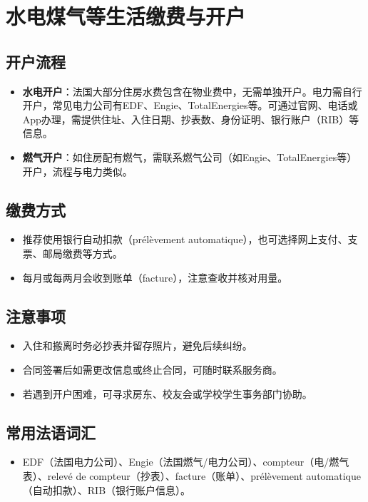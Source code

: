 \section{水电煤气等生活缴费与开户}

\subsection{开户流程}
\begin{itemize}
    \item \textbf{水电开户}：法国大部分住房水费包含在物业费中，无需单独开户。电力需自行开户，常见电力公司有EDF、Engie、TotalEnergies等。可通过官网、电话或App办理，需提供住址、入住日期、抄表数、身份证明、银行账户（RIB）等信息。
    \item \textbf{燃气开户}：如住房配有燃气，需联系燃气公司（如Engie、TotalEnergies等）开户，流程与电力类似。
\end{itemize}

\subsection{缴费方式}
\begin{itemize}
    \item 推荐使用银行自动扣款（prélèvement automatique），也可选择网上支付、支票、邮局缴费等方式。
    \item 每月或每两月会收到账单（facture），注意查收并核对用量。
\end{itemize}

\subsection{注意事项}
\begin{itemize}
    \item 入住和搬离时务必抄表并留存照片，避免后续纠纷。
    \item 合同签署后如需更改信息或终止合同，可随时联系服务商。
    \item 若遇到开户困难，可寻求房东、校友会或学校学生事务部门协助。
\end{itemize}

\subsection{常用法语词汇}
\begin{itemize}
    \item EDF（法国电力公司）、Engie（法国燃气/电力公司）、compteur（电/燃气表）、relevé de compteur（抄表）、facture（账单）、prélèvement automatique（自动扣款）、RIB（银行账户信息）。
\end{itemize}
